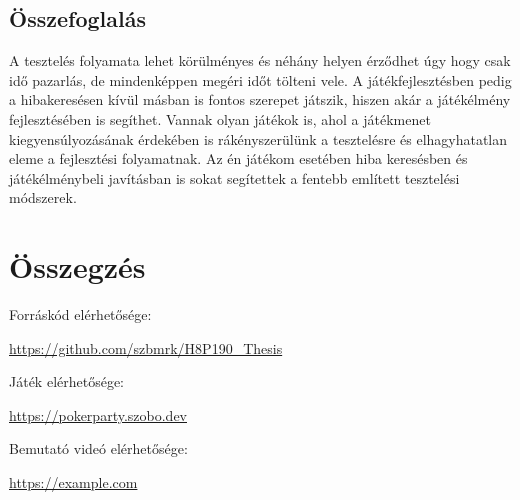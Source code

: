\documentclass[]{thesis-ekf}
\theoremstyle{definition}
\theoremstyle{remark}
\begin{document}
\section{Összefoglalás}

A tesztelés folyamata lehet körülményes és néhány helyen érződhet úgy hogy csak idő pazarlás, de mindenképpen megéri időt tölteni vele. A játékfejlesztésben pedig a hibakeresésen kívül másban is fontos szerepet játszik, hiszen akár a játékélmény fejlesztésében is segíthet. Vannak olyan játékok is, ahol a játékmenet kiegyensúlyozásának érdekében is rákényszerülünk a tesztelésre és elhagyhatatlan eleme a fejlesztési folyamatnak. Az én játékom esetében hiba keresésben és játékélménybeli javításban is sokat segítettek a fentebb említett tesztelési módszerek.

\chapter*{Összegzés}

\begin{center}
	Forráskód elérhetősége:
	
	{\color{teal}\url{https://github.com/szbmrk/H8P190_Thesis}}
	
	Játék elérhetősége:
	
	{\color{teal}\url{https://pokerparty.szobo.dev}}
	
	Bemutató videó elérhetősége:
	
	{\color{teal}\url{https://example.com}}
\end{center}
\end{document}
